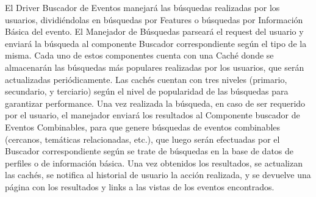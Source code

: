 El Driver Buscador de Eventos manejará las búsquedas realizadas por los usuarios, dividiéndolas en búsquedas por Features o búsquedas por Información Básica del evento. El Manejador de Búsquedas parseará el request del usuario y enviará la búsqueda al componente Buscador correspondiente según el tipo de la misma. Cada uno de estos componentes cuenta con una Caché donde se almacenarán las búsquedas más populares realizadas por los usuarios, que serán actualizadas periódicamente. Las cachés cuentan con tres niveles (primario, secundario, y terciario) según el nivel de popularidad de las búsquedas para garantizar performance. Una vez realizada la búsqueda, en caso de ser requerido por el usuario, el manejador enviará los resultados al Componente buscador de Eventos Combinables, para que genere búsquedas de eventos combinables (cercanos, temáticas relacionadas, etc.), que luego serán efectuadas por el Buscador correspondiente según se trate de búsquedas en la base de datos de perfiles o de información básica. Una vez obtenidos los resultados, se actualizan las cachés, se notifica al historial de usuario la acción realizada, y se devuelve una página con los resultados y links a las vistas de los eventos encontrados.
